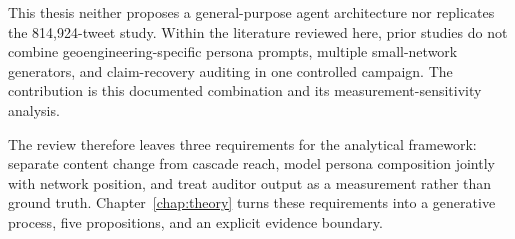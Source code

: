 This thesis neither proposes a general-purpose agent architecture nor
replicates the 814,924-tweet study. Within the literature reviewed here,
prior studies do not combine geoengineering-specific persona prompts, multiple
small-network generators, and claim-recovery auditing in one controlled
campaign. The contribution is this documented combination and its
measurement-sensitivity analysis.

The review therefore leaves three requirements for the analytical framework:
separate content change from cascade reach, model persona composition jointly
with network position, and treat auditor output as a measurement rather than
ground truth. Chapter~\ref{chap:theory} turns these requirements into a
generative process, five propositions, and an explicit evidence boundary.
